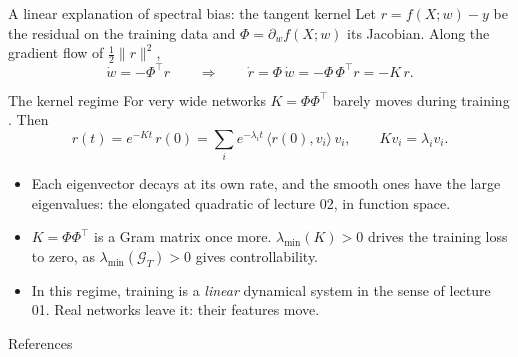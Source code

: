 \documentclass[10pt]{beamer}
\newcommand{\Gram}{\mathcal{G}}
\begin{document}
\begin{frame}{A linear explanation of spectral bias: the tangent kernel}
\small
Let $r=f(X;w)-y$ be the residual on the training data and $\Phi=\partial_wf(X;w)$ its Jacobian. Along the gradient flow of $\tfrac12\|r\|^2$,
\[
\dot w=-\Phi^\top r\qquad\Longrightarrow\qquad\dot r=\Phi\,\dot w=-\Phi\,\Phi^\top r=-K\,r .
\]
\begin{mathbox}{The kernel regime}
For very wide networks $K=\Phi\Phi^\top$ barely moves during training \citep{jacot2018}. Then
\[
r(t)=e^{-Kt}\,r(0)=\sum_ie^{-\lambda_it}\,\langle r(0),v_i\rangle\,v_i ,\qquad Kv_i=\lambda_iv_i .
\]
\end{mathbox}
\footnotesize
\begin{itemize}
\item Each eigenvector decays at its own rate, and the smooth ones have the large eigenvalues: \alert{the elongated quadratic of lecture 02, in function space}.
\item $K=\Phi\Phi^\top$ is a Gram matrix once more. $\lambda_{\min}(K)>0$ drives the training loss to zero, as $\lambda_{\min}(\Gram_T)>0$ gives controllability.
\item In this regime, training is a \emph{linear} dynamical system in the sense of lecture 01. Real networks leave it: their features move.
\end{itemize}
\end{frame}


\begin{frame}[allowframebreaks]{References}
\scriptsize


\end{frame}
\end{document}

